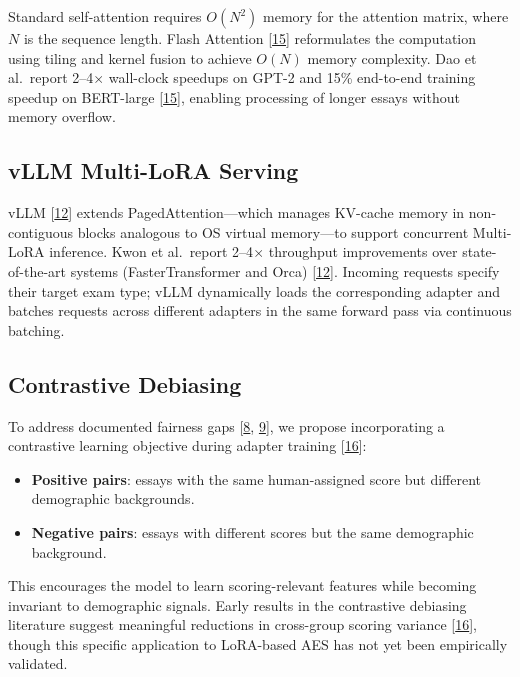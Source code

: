\documentclass[12pt]{article}
\begin{document}
Standard self-attention requires $O(N^2)$ memory for the attention matrix, where $N$ is the sequence length. Flash Attention [\hyperlink{ref15}{15}] reformulates the computation using tiling and kernel fusion to achieve $O(N)$ memory complexity. Dao et al.\ report 2--4$\times$ wall-clock speedups on GPT-2 and 15\% end-to-end training speedup on BERT-large [\hyperlink{ref15}{15}], enabling processing of longer essays without memory overflow.

\subsection{vLLM Multi-LoRA Serving}

vLLM [\hyperlink{ref12}{12}] extends PagedAttention---which manages KV-cache memory in non-contiguous blocks analogous to OS virtual memory---to support concurrent Multi-LoRA inference. Kwon et al.\ report 2--4$\times$ throughput improvements over state-of-the-art systems (FasterTransformer and Orca) [\hyperlink{ref12}{12}]. Incoming requests specify their target exam type; vLLM dynamically loads the corresponding adapter and batches requests across different adapters in the same forward pass via continuous batching.

\subsection{Contrastive Debiasing}

To address documented fairness gaps [\hyperlink{ref8}{8}, \hyperlink{ref9}{9}], we propose incorporating a contrastive learning objective during adapter training [\hyperlink{ref16}{16}]:

\begin{itemize}[leftmargin=*]
    \item \textbf{Positive pairs}: essays with the same human-assigned score but different demographic backgrounds.
    \item \textbf{Negative pairs}: essays with different scores but the same demographic background.
\end{itemize}

\noindent This encourages the model to learn scoring-relevant features while becoming invariant to demographic signals. Early results in the contrastive debiasing literature suggest meaningful reductions in cross-group scoring variance [\hyperlink{ref16}{16}], though this specific application to LoRA-based AES has not yet been empirically validated.
\end{document}
